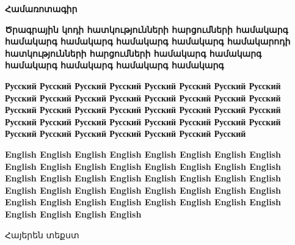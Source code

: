 \thispagestyle{plain}
\begin{center}
    \Large
    \textbf{\textbf{Համառոտագիր}}
\end{center}
  

	\large
	\justifying
	\vspace{0.5cm}
	\textbf{Ծրագրային կոդի հատկությունների հարցումների համակարգ համակարգ համակարգ համակարգ համակարգ համակարոդի հատկությունների հարցումների համակարգ համակարգ համակարգ համակարգ համակարգ համակարգ}
	
	\vspace{0.5cm}
	\textbf{Русский Русский Русский Русский Русский Русский Русский Русский Русский Русский Русский Русский Русский Русский Русский Русский Русский Русский Русский Русский Русский Русский Русский Русский Русский Русский Русский Русский Русский Русский Русский Русский Русский Русский Русский Русский Русский Русский Русский }
	
	\vspace{0.5cm}
	\textbf{ English English English English English English English English English English English English English English English English English English English English English English English English English English English English English English English English English English English English English English English English English English English English}

    \vspace{1cm}

Հայերեն տեքստ